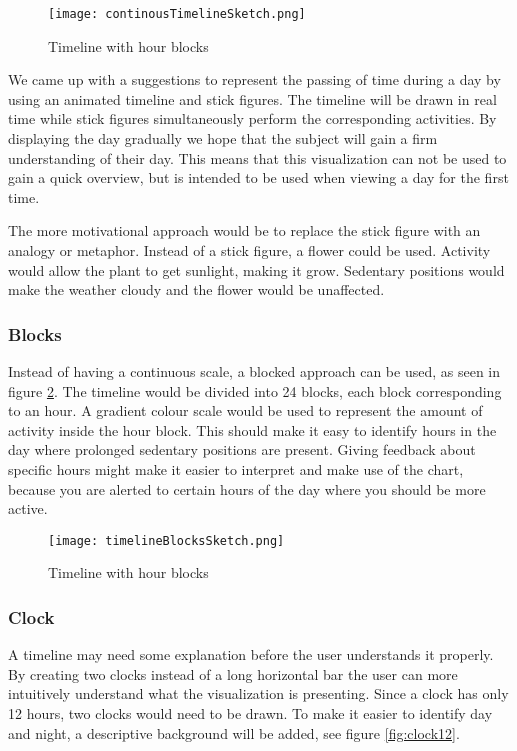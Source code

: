 \begin{figure}[h!]
	\centering
		\texttt{[image: continousTimelineSketch.png]}
		\caption{\footnotesize Timeline with hour blocks}
		\label{fig:timelineContinuous}
\end{figure}
We came up with a suggestions to represent the passing of time during a day by using an animated timeline and stick figures. The timeline will be drawn in real time while stick figures simultaneously perform the corresponding activities. By displaying the day gradually we hope that the subject will gain a firm understanding of their day. This means that this visualization can not be used to gain a quick overview, but is intended to be used when viewing a day for the first time.

The more motivational approach would be to replace the stick figure with an analogy or metaphor. Instead of a stick figure, a flower could be used. Activity would allow the plant to get sunlight, making it grow. Sedentary positions would make the weather cloudy and the flower would be unaffected.

\subsubsection{Blocks}
Instead of having a continuous scale, a blocked approach can be used, as seen in figure \ref{fig:timelineBlocks}. The timeline would be divided into 24 blocks, each block corresponding to an hour. A gradient colour scale would be used to represent the amount of activity inside the hour block. This should make it easy to identify hours in the day where prolonged sedentary positions are present. Giving feedback about specific hours might make it easier to interpret and make use of the chart, because you are alerted to certain hours of the day where you should be more active.

\begin{figure}[h!]
	\centering
		\texttt{[image: timelineBlocksSketch.png]}
		\caption{\footnotesize Timeline with hour blocks}
		\label{fig:timelineBlocks}
\end{figure}

\subsubsection{Clock}
A timeline may need some explanation before the user understands it properly. By creating two clocks instead of a long horizontal bar the user can more intuitively understand what the visualization is presenting. Since a clock has only 12 hours, two clocks would need to be drawn. To make it easier to identify day and night, a descriptive background will be added, see figure \ref{fig:clock12}.

